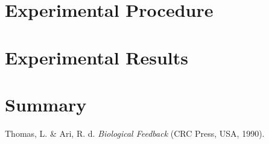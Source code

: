 \documentclass{article}
\begin{document}
  \newpage
  \section{Experimental Procedure}





  \newpage
  \section{Experimental Results}


  \section{Summary}


  \begin{thebibliography}{unsrt}
      Thomas, L. \& Ari, R. d. \emph{Biological Feedback} (CRC Press, USA, 1990).
  \end{thebibliography}
\end{document}
